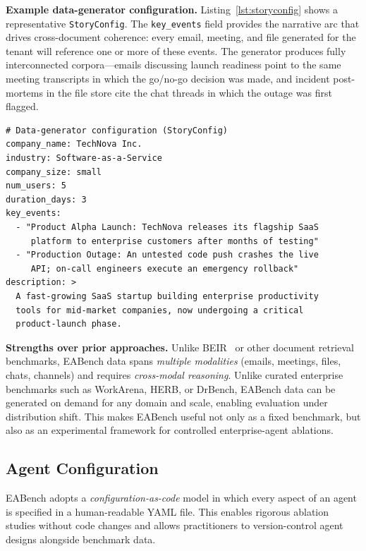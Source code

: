 \documentclass[10pt,twocolumn]{article}
\begin{document}
\textbf{Example data-generator configuration.}
Listing~\ref{lst:storyconfig} shows a representative \texttt{StoryConfig}.
The \texttt{key\_events} field provides the narrative arc that drives
cross-document coherence: every email, meeting, and file generated for
the tenant will reference one or more of these events.
The generator produces fully interconnected corpora---emails discussing
launch readiness point to the same meeting transcripts in which
the go/no-go decision was made, and incident post-mortems in the file
store cite the chat threads in which the outage was first flagged.

\begin{lstlisting}[caption={Example StoryConfig for a software-startup tenant.},label={lst:storyconfig}]
# Data-generator configuration (StoryConfig)
company_name: TechNova Inc.
industry: Software-as-a-Service
company_size: small
num_users: 5
duration_days: 3
key_events:
  - "Product Alpha Launch: TechNova releases its flagship SaaS
     platform to enterprise customers after months of testing"
  - "Production Outage: An untested code push crashes the live
     API; on-call engineers execute an emergency rollback"
description: >
  A fast-growing SaaS startup building enterprise productivity
  tools for mid-market companies, now undergoing a critical
  product-launch phase.
\end{lstlisting}

\textbf{Strengths over prior approaches.}
Unlike BEIR~\citep{thakur2021beir} or other document retrieval benchmarks,
EABench data spans \emph{multiple modalities} (emails, meetings, files, chats,
channels) and requires \emph{cross-modal reasoning}.  Unlike curated enterprise
benchmarks such as WorkArena, HERB, or DrBench, EABench data can be generated
on demand for any domain and scale, enabling evaluation under distribution
shift.  This makes EABench useful not only as a fixed benchmark, but also as an
experimental framework for controlled enterprise-agent ablations.

\subsection{Agent Configuration}
\label{sec:agentconfig}

EABench adopts a \emph{configuration-as-code} model in which every aspect of
an agent is specified in a human-readable YAML file.  This enables rigorous
ablation studies without code changes and allows practitioners to
version-control agent designs alongside benchmark data.
\end{document}
